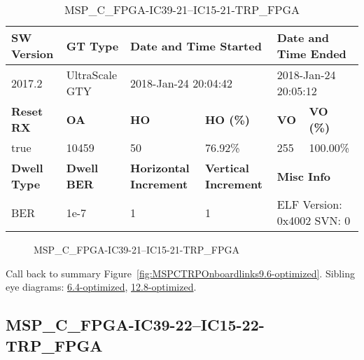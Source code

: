 \begin{table}[h]
\centering
\caption{MSP\_C\_FPGA-IC39-21--IC15-21-TRP\_FPGA}
\label{tab:MSPCFPGAIC3921IC1521TRPFPGA9.6-optimized}
\begin{tabular}{@{}|l|l|l|l|l|l|@{}}
\toprule
\textbf{SW Version}                & \textbf{GT Type}   & \multicolumn{2}{l|}{\textbf{Date and Time Started}}            & \multicolumn{2}{l|}{\textbf{Date and Time Ended}}        \\ \midrule
2017.2                       & UltraScale GTY          & \multicolumn{2}{l|}{2018-Jan-24 20:04:42}                   & \multicolumn{2}{l|}{2018-Jan-24 20:05:12}               \\ \midrule
\textbf{Reset RX}                  & \textbf{OA} & \textbf{HO}   & \textbf{HO (\%)} & \textbf{VO} & \textbf{VO (\%)} \\ \midrule
true & 10459        & 50          & 76.92\%        & 255        & 100.00\%       \\ \midrule
\textbf{Dwell Type}                & \textbf{Dwell BER} & \textbf{Horizontal Increment} & \textbf{Vertical Increment}    & \multicolumn{2}{l|}{\textbf{Misc Info}}                  \\ \midrule
BER                            & 1e-7        & 1        & 1           & \multicolumn{2}{l|}{ELF Version: 0x4002 SVN: 0}                         \\ \bottomrule
\end{tabular}
\end{table}

\begin{figure}[h]
\caption{MSP\_C\_FPGA-IC39-21--IC15-21-TRP\_FPGA} \label{fig:MSPCFPGAIC3921IC1521TRPFPGA9.6-optimized}
\end{figure}

Call back to summary Figure~\ref{fig:MSPCTRPOnboardlinks9.6-optimized}.
Sibling eye diagrams: \hyperref[sec:MSPCFPGAIC3921IC1521TRPFPGA6.4-optimized]{6.4-optimized}, \hyperref[sec:MSPCFPGAIC3921IC1521TRPFPGA12.8-optimized]{12.8-optimized}.

\clearpage
\newpage


\subsection{MSP\_C\_FPGA-IC39-22--IC15-22-TRP\_FPGA}\label{sec:MSPCFPGAIC3922IC1522TRPFPGA9.6-optimized}

